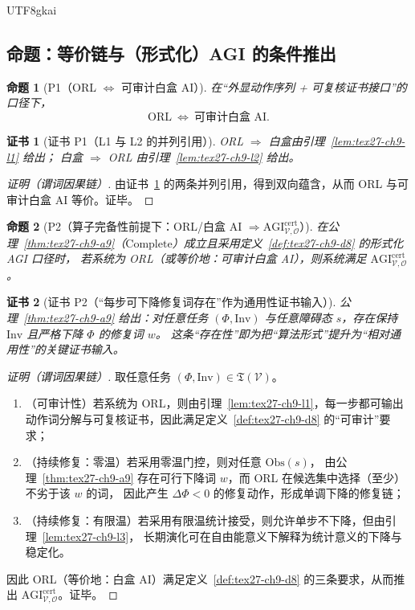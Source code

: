 \documentclass[12pt]{article}
\newtheorem{proposition}{命题}[section]
\newtheorem{Certificate}{证书}[section]
\begin{document}
\begin{CJK*}{UTF8}{gkai}
\subsection{命题：等价链与（形式化）AGI 的条件推出}
\label{subsec:tex27-ch9-props}

\begin{proposition}[P1（ORL $\Longleftrightarrow$ 可审计白盒 AI）]
\label{prop:tex27-ch9-p1}
在“外显动作序列 + 可复核证书接口”的口径下，
\[
  \mathrm{ORL}\ \Longleftrightarrow\ \text{可审计白盒 AI}.
\]
\end{proposition}

\begin{Certificate}[证书 P1（L1 与 L2 的并列引用）]
\label{cert:tex27-ch9-p1}
ORL $\Rightarrow$ 白盒由引理~\ref{lem:tex27-ch9-l1} 给出；
白盒 $\Rightarrow$ ORL 由引理~\ref{lem:tex27-ch9-l2} 给出。
\end{Certificate}

\begin{proof}[证明（谓词因果链）]
由证书~\ref{cert:tex27-ch9-p1} 的两条并列引用，得到双向蕴含，从而 ORL 与可审计白盒 AI 等价。证毕。
\end{proof}

\begin{proposition}[P2（算子完备性前提下：ORL/白盒 AI $\Rightarrow \mathrm{AGI}^{\mathrm{cert}}_{\mathcal{V},\mathcal{O}}$）]
\label{prop:tex27-ch9-p2}
在公理~\ref{thm:tex27-ch9-a9}（$\mathrm{Complete}$）成立且采用定义~\ref{def:tex27-ch9-d8} 的形式化 AGI 口径时，
若系统为 ORL（或等价地：可审计白盒 AI），则系统满足 $\mathrm{AGI}^{\mathrm{cert}}_{\mathcal{V},\mathcal{O}}$。
\end{proposition}

\begin{Certificate}[证书 P2（“每步可下降修复词存在”作为通用性证书输入）]
\label{cert:tex27-ch9-p2}
公理~\ref{thm:tex27-ch9-a9} 给出：对任意任务 $(\Phi,\mathrm{Inv})$ 与任意障碍态 $s$，存在保持 $\mathrm{Inv}$ 且严格下降 $\Phi$ 的修复词 $w$。
这条“存在性”即为把“算法形式”提升为“相对通用性”的关键证书输入。
\end{Certificate}

\begin{proof}[证明（谓词因果链）]
取任意任务 $(\Phi,\mathrm{Inv})\in\mathfrak{T}(\mathcal{V})$。
\begin{enumerate}
  \item（可审计性）若系统为 ORL，则由引理~\ref{lem:tex27-ch9-l1}，每一步都可输出动作词分解与可复核证书，因此满足定义~\ref{def:tex27-ch9-d8} 的“可审计”要求；
  \item（持续修复：零温）若采用零温门控，则对任意 $\mathrm{Obs}(s)$，
  由公理~\ref{thm:tex27-ch9-a9} 存在可行下降词 $w$，而 ORL 在候选集中选择（至少）不劣于该 $w$ 的词，
  因此产生 $\Delta\Phi<0$ 的修复动作，形成单调下降的修复链；
  \item（持续修复：有限温）若采用有限温统计接受，则允许单步不下降，但由引理~\ref{lem:tex27-ch9-l3}，
  长期演化可在自由能意义下解释为统计意义的下降与稳定化。
\end{enumerate}
因此 ORL（等价地：白盒 AI）满足定义~\ref{def:tex27-ch9-d8} 的三条要求，从而推出 $\mathrm{AGI}^{\mathrm{cert}}_{\mathcal{V},\mathcal{O}}$。证毕。
\end{proof}


\end{CJK*}
\end{document}

